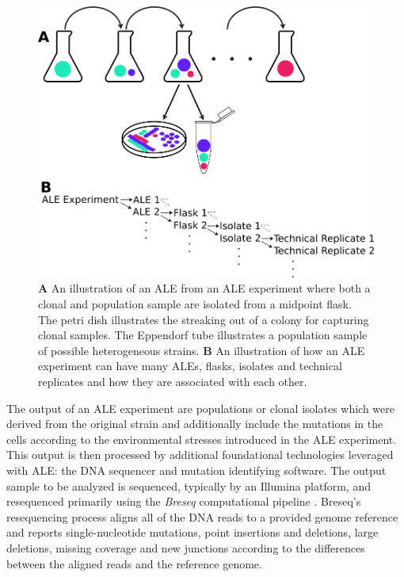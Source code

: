 \documentclass[12pt,final,masters,chapterheads]{ucsd}  %
\begin{document}
\begin{figure}[h!]
  \centering
  \includegraphics[width=1\textwidth]{ale_experiment_samples.png}
  \caption[An illustration of an ALE and its component organization]{\textbf{A} An illustration of an ALE from an ALE experiment where both a clonal and population sample are isolated from a midpoint flask. The petri dish illustrates the streaking out of a colony for capturing clonal samples. The Eppendorf tube illustrates a population sample of possible heterogeneous strains. \textbf{B} An illustration of how an ALE experiment can have many ALEs, flasks, isolates and technical replicates and how they are associated with each other.}
  \label{fig:ale_experiment_samples}
\end{figure}
The output of an ALE experiment are populations or clonal isolates which were derived from the original strain and additionally include the mutations in the cells according to the environmental stresses introduced in the ALE experiment. This output is then processed by additional foundational technologies leveraged with ALE: the DNA sequencer and mutation identifying software. The output sample to be analyzed is sequenced, typically by an Illumina platform, and resequenced primarily using the \textit{Breseq} computational pipeline \cite{breseq_paper}. Breseq's resequencing process aligns all of the DNA reads to a provided genome reference and reports single-nucleotide mutations, point insertions and deletions, large deletions, missing coverage and new junctions according to the differences between the aligned reads and the reference genome.
\end{document}
